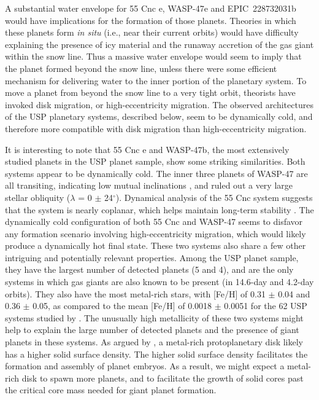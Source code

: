 \documentclass[twocolumn]{aastex61}
\begin{document}
A substantial water envelope
for 55 Cnc e, WASP-47e and EPIC~228732031b would have implications for
the formation of those planets. Theories in which these planets form {\it in situ} (i.e., near their
current orbits) would have difficulty explaining the presence of icy material
and the runaway accretion of the gas giant within the snow line.  Thus a massive water envelope
would seem to imply that the planet formed
beyond the snow line, unless there were some efficient mechanism for delivering
water to the inner portion of the planetary system.
To move a planet from beyond
the snow line to a very tight orbit, theorists have invoked disk migration, or
high-eccentricity migration. The observed architectures of the USP planetary systems, described below,
seem to be dynamically cold, and therefore more compatible
with disk migration than high-eccentricity migration.

It is interesting to note
that 55 Cnc e and WASP-47b, the most extensively studied planets in the USP planet sample, show some striking similarities.
Both systems appear to be dynamically cold.
The inner three planets of WASP-47 are all transiting, indicating low mutual inclinations \citep{Becker2015}, and \citet{Sanchis-Ojeda2015} ruled out a very large stellar obliquity ($\lambda$ = 0 $\pm$ 24$^{\circ}$). Dynamical analysis of the 55 Cnc system suggests that the
system is nearly coplanar, which helps maintain long-term stability \citep{Nelson2014}.
The dynamically cold configuration of both 55 Cnc and WASP-47 seems to disfavor any formation
scenario involving high-eccentricity migration, which would likely produce a dynamically hot final state. These two systems also share a few other intriguing and potentially relevant properties.
Among the USP planet sample, they have the largest number of detected planets (5 and 4), and are the only
systems in which gas giants are also known to be present (in 14.6-day and 4.2-day orbits).
They also have the most metal-rich stars, with [Fe/H] of 0.31 $\pm$ 0.04 and 0.36 $\pm$ 0.05,
as compared to the mean [Fe/H] of 0.0018 $\pm$ 0.0051 for the 62 USP systems studied by \citet{Winn2017}. The unusually high metallicity of these two systems might help to explain the large number of detected planets and the presence of giant planets in these systems. As argued by \citet{Dawson2016}, a metal-rich protoplanetary disk likely has a higher solid surface density. The higher solid surface density facilitates the formation and assembly of planet embryos. As a result, we might expect
a metal-rich disk to spawn more planets, and to facilitate the growth of solid cores past the critical core mass needed for giant planet formation.
\end{document}

